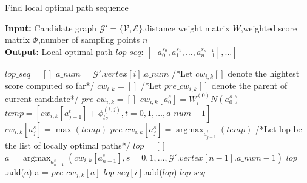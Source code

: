 \documentclass[a4paper,12pt]{article}
\begin{document}
 
\begin{CJK}{UTF8}{gbsn} 
\begin{algorithm} 
    \setcounter{algorithm}{0}
    \caption{Find local optimal path sequence} 
    \hspace*{0.02in} {\bf Input:} Candidate graph $\mathcal{G}'=\{\mathcal{V},\mathcal{E}\}$,distance weight matrix $W$,weighted score matrix $\Phi$,number of sampling points $n$ \\ 
    \hspace*{0.02in} {\bf Output:} Local optimal path $lop\_seq$: $[[a_0^{s_0},a_1^{s_1},\dots,a_{n-1}^{s_{n-1}}],\dots]$
    \begin{algorithmic}[1]
    \iffalse
    \fi
	\State $lop\_seq=[]$
            \State 
			$a\_num$ = $\mathcal{G}'.vertex[i].a\_num$ 
				\State /*Let $cw_{i,k}[]$ denote the hightest score computed so far*/ 
				\State $cw_{i,k} = []$ 
				\State /*Let $pre\_cw_{i,k}[]$ denote the parent of current candidate*/ 
				\State $pre\_cw_{i,k} = []$ 
					\State $cw_{i,k}[a_0^s] = W_i^{(0)}N(a_0^s)$
				\EndFor
						\State $temp=[cw_{i,k}[a_{j-1}^t]+\phi_{ts}^{(i,j)},t=0,1,\dots,a\_num-1]$
						\State $cw_{i,k}[a_{j}^s] = \max{(temp)}$
						\State $pre\_cw_{i,k}[a_j^s] = \mathop{\mathrm{argmax}}_{a_{j-1}^t}{(temp)}
$
					\EndFor
				\EndFor
				\State /*Let lop be the list of locally optimal paths*/
				\State $lop = []$
				\State $a = \mathop{\mathrm{argmax}}_{a_{n-1}^s}{(cw_{i,k}[a_{n-1}^s],s=0,1,\dots,\mathcal{G}'.vertex[n-1].a\_num-1)}$
					\State $lop$.add($a$)
					\State a = $pre\_cw_{j,k}[a]$
				\EndFor
				\State $lop\_seq[i]$.add($lop$)
			\EndFor
        \EndFor
	\State \Return $lop\_seq$
    \end{algorithmic} 
\end{algorithm}
\end{CJK} 
\end{document}

